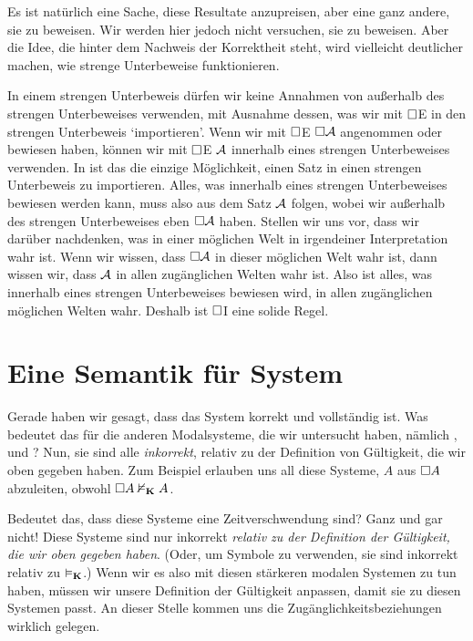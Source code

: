 Es ist natürlich eine Sache, diese Resultate anzupreisen, aber eine ganz andere, sie zu beweisen. Wir werden hier jedoch nicht versuchen, sie zu beweisen. Aber die Idee, die hinter dem Nachweis der Korrektheit steht, wird vielleicht deutlicher machen, wie strenge Unterbeweise funktionieren. 

In einem strengen Unterbeweis dürfen wir keine Annahmen von au{\ss}erhalb des strengen Unterbeweises verwenden, mit Ausnahme dessen, was wir mit $\Box$E in den strengen Unterbeweis `importieren'. Wenn wir mit $\Box$E $\Box \mathcal{A}$ angenommen oder bewiesen haben, können wir mit $\Box$E $\mathcal{A}$ innerhalb eines strengen Unterbeweises verwenden. In \mlK{} ist das die einzige Möglichkeit, einen Satz in einen strengen Unterbeweis zu importieren. Alles, was innerhalb eines strengen Unterbeweises bewiesen werden kann, muss also aus dem Satz $\mathcal{A}$ folgen, wobei wir au{\ss}erhalb des strengen Unterbeweises eben $\Box \mathcal{A}$ haben. Stellen wir uns vor, dass wir darüber nachdenken, was in einer möglichen Welt in irgendeiner Interpretation wahr ist. Wenn wir wissen, dass $\Box\mathcal{A}$ in dieser möglichen Welt wahr ist, dann wissen wir, dass $\mathcal{A}$ in allen zugänglichen Welten wahr ist. Also ist alles, was innerhalb eines strengen Unterbeweises bewiesen wird, in allen zugänglichen möglichen Welten wahr. Deshalb ist $\Box$I eine solide Regel.

\section{Eine Semantik für System \mlT}
\label{SemanticsT}

Gerade haben wir gesagt, dass das System \mlK{} korrekt und vollständig ist. Was bedeutet das für die anderen Modalsysteme, die wir untersucht haben, nämlich \mlT, \mlSfour{} und \mlSfive? Nun, sie sind alle \emph{inkorrekt}, relativ zu der Definition von Gültigkeit, die wir oben gegeben haben. Zum Beispiel erlauben uns all diese Systeme, $A$ aus $\Box A$ abzuleiten, obwohl $\Box A \nvDash_{\mathbf{K}} A$.

Bedeutet das, dass diese Systeme eine Zeitverschwendung sind? Ganz und gar nicht! Diese Systeme sind nur inkorrekt \emph{relativ zu der Definition der Gültigkeit, die wir oben gegeben haben}. (Oder, um Symbole zu verwenden, sie sind inkorrekt relativ zu $\vDash_{\mathbf{K}}$.) Wenn wir es also mit diesen stärkeren modalen Systemen zu tun haben, müssen wir unsere Definition der Gültigkeit anpassen, damit sie zu diesen Systemen passt. An dieser Stelle kommen uns die Zugänglichkeitsbeziehungen wirklich gelegen.

